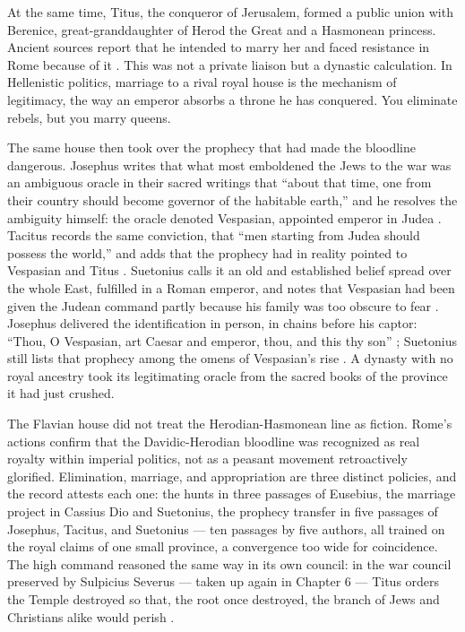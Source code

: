 At the same time, Titus, the conqueror of Jerusalem, formed a public union with Berenice, great-granddaughter of Herod the Great and a Hasmonean princess.
Ancient sources report that he intended to marry her and faced resistance in Rome because of it \cite[66.15]{cassiusdio:romanhistory} \cite[Titus 7]{suetonius:caesars}.
This was not a private liaison but a dynastic calculation.
In Hellenistic politics, marriage to a rival royal house is the mechanism of legitimacy, the way an emperor absorbs a throne he has conquered.
You eliminate rebels, but you marry queens.

The same house then took over the prophecy that had made the bloodline dangerous.
Josephus writes that what most emboldened the Jews to the war was an ambiguous oracle in their sacred writings that ``about that time, one from their country should become governor of the habitable earth,'' and he resolves the ambiguity himself: the oracle denoted Vespasian, appointed emperor in Judea \cite[6.312--313]{josephus:war}.
Tacitus records the same conviction, that ``men starting from Judea should possess the world,'' and adds that the prophecy had in reality pointed to Vespasian and Titus \cite[5.13]{tacitus:histories}.
Suetonius calls it an old and established belief spread over the whole East, fulfilled in a Roman emperor, and notes that Vespasian had been given the Judean command partly because his family was too obscure to fear \cite[Vespasian 4]{suetonius:caesars}.
Josephus delivered the identification in person, in chains before his captor: ``Thou, O Vespasian, art Caesar and emperor, thou, and this thy son'' \cite[3.8.9]{josephus:war}; Suetonius still lists that prophecy among the omens of Vespasian's rise \cite[Vespasian 5]{suetonius:caesars}.
A dynasty with no royal ancestry took its legitimating oracle from the sacred books of the province it had just crushed.

The Flavian house did not treat the Herodian-Hasmonean line as fiction.
Rome's actions confirm that the Davidic-Herodian bloodline was recognized as real royalty within imperial politics, not as a peasant movement retroactively glorified.
Elimination, marriage, and appropriation are three distinct policies, and the record attests each one: the hunts in three passages of Eusebius, the marriage project in Cassius Dio and Suetonius, the prophecy transfer in five passages of Josephus, Tacitus, and Suetonius --- ten passages by five authors, all trained on the royal claims of one small province, a convergence too wide for coincidence.
The high command reasoned the same way in its own council: in the war council preserved by Sulpicius Severus --- taken up again in Chapter 6 --- Titus orders the Temple destroyed so that, the root once destroyed, the branch of Jews and Christians alike would perish \cite[2.30.6--7]{sulpicius:chronica}.

